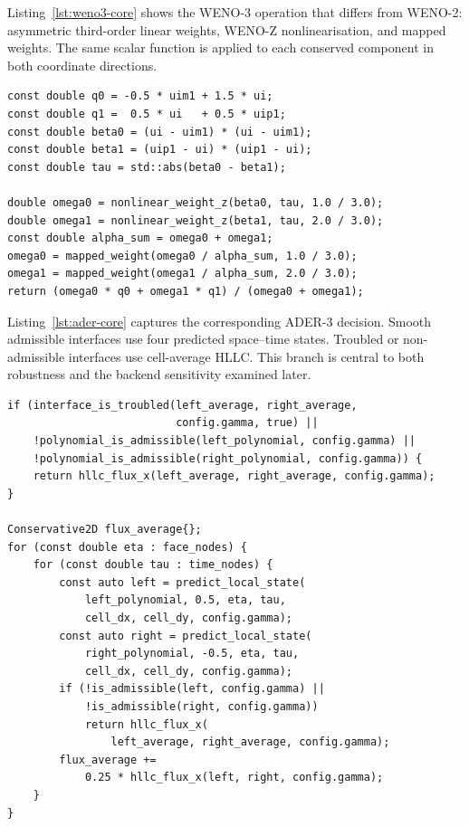Listing~\ref{lst:weno3-core} shows the WENO-3 operation that differs from WENO-2: asymmetric third-order linear weights, WENO-Z nonlinearisation, and mapped weights. The same scalar function is applied to each conserved component in both coordinate directions.

\begin{lstlisting}[caption={Core left-state WENO-3 reconstruction used by the CPU implementation.},label={lst:weno3-core}]
const double q0 = -0.5 * uim1 + 1.5 * ui;
const double q1 =  0.5 * ui   + 0.5 * uip1;
const double beta0 = (ui - uim1) * (ui - uim1);
const double beta1 = (uip1 - ui) * (uip1 - ui);
const double tau = std::abs(beta0 - beta1);

double omega0 = nonlinear_weight_z(beta0, tau, 1.0 / 3.0);
double omega1 = nonlinear_weight_z(beta1, tau, 2.0 / 3.0);
const double alpha_sum = omega0 + omega1;
omega0 = mapped_weight(omega0 / alpha_sum, 1.0 / 3.0);
omega1 = mapped_weight(omega1 / alpha_sum, 2.0 / 3.0);
return (omega0 * q0 + omega1 * q1) / (omega0 + omega1);
\end{lstlisting}

Listing~\ref{lst:ader-core} captures the corresponding ADER-3 decision. Smooth admissible interfaces use four predicted space--time states. Troubled or non-admissible interfaces use cell-average HLLC. This branch is central to both robustness and the backend sensitivity examined later.

\begin{lstlisting}[caption={Condensed ADER-3 face-flux and local-fallback logic.},label={lst:ader-core}]
if (interface_is_troubled(left_average, right_average,
                          config.gamma, true) ||
    !polynomial_is_admissible(left_polynomial, config.gamma) ||
    !polynomial_is_admissible(right_polynomial, config.gamma)) {
    return hllc_flux_x(left_average, right_average, config.gamma);
}

Conservative2D flux_average{};
for (const double eta : face_nodes) {
    for (const double tau : time_nodes) {
        const auto left = predict_local_state(
            left_polynomial, 0.5, eta, tau,
            cell_dx, cell_dy, config.gamma);
        const auto right = predict_local_state(
            right_polynomial, -0.5, eta, tau,
            cell_dx, cell_dy, config.gamma);
        if (!is_admissible(left, config.gamma) ||
            !is_admissible(right, config.gamma))
            return hllc_flux_x(
                left_average, right_average, config.gamma);
        flux_average +=
            0.25 * hllc_flux_x(left, right, config.gamma);
    }
}
\end{lstlisting}

